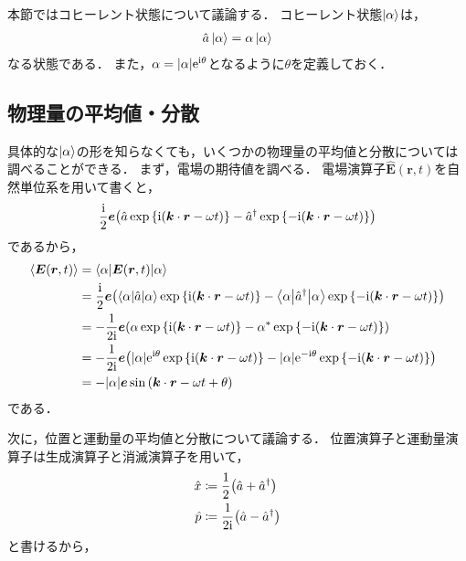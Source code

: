 \documentclass{report}
\begin{document}
  本節ではコヒーレント状態について議論する．
  コヒーレント状態$\ket{\alpha}$は，
  \begin{align}
    \hat{a}\ket{\alpha} = \alpha\ket{\alpha}
  \end{align}
  なる状態である．
  また，$\alpha = \abs{\alpha}\mathrm{e}^{\mathrm{i}\theta}$となるように$\theta$を定義しておく．
  \subsection{物理量の平均値・分散}
    具体的な$\ket{\alpha}$の形を知らなくても，いくつかの物理量の平均値と分散については調べることができる．
    まず，電場の期待値を調べる．
    電場演算子$\hat{\bm{E}}(\bm{r}, t)$を自然単位系を用いて書くと，
    \begin{align}
      \frac{\mathrm{i}}{2}\bm{e}\qty(\hat{a}\exp\qty{\mathrm{i}(\bm{k}\cdot\bm{r} - \omega t)} - \hat{a}^{\dag}\exp\qty{-\mathrm{i}(\bm{k}\cdot\bm{r} - \omega t)})
    \end{align}
    であるから，
    \begin{align}
      \ev{\bm{E}(\bm{r}, t)} &= \mel**{\alpha}{\bm{E}(\bm{r}, t)}{\alpha} \\ 
      &= \frac{\i}{2}\bm{e}\qty(\mel**{\alpha}{\hat{a}}{\alpha}\exp\qty{\i(\bm{k}\cdot\bm{r} - \omega t)} - \mel**{\alpha}{\hat{a}^{\dag}}{\alpha}\exp\qty{-\i(\bm{k}\cdot\bm{r} - \omega t)}) \\ 
      &= -\frac{1}{2\i}\bm{e}\qty(\alpha\exp\qty{\i(\bm{k}\cdot\bm{r} - \omega t)} - \alpha^*\exp\qty{-\i(\bm{k}\cdot\bm{r} - \omega t)}) \\ 
      &= -\frac{1}{2\i}\bm{e}\qty(\abs{\alpha}\e^{\i\theta}\exp\qty{\i(\bm{k}\cdot\bm{r} - \omega t)} - \abs{\alpha}\e^{-\i\theta}\exp\qty{-\i(\bm{k}\cdot\bm{r} - \omega t)}) \\ 
      &= -\abs{\alpha}\bm{e}\sin\qty(\bm{k}\cdot\bm{r} - \omega t + \theta)
    \end{align}
    である．
    \par
    次に，位置と運動量の平均値と分散について議論する．
    位置演算子と運動量演算子は生成演算子と消滅演算子を用いて，
    \begin{align}
      \hat{x} &\coloneqq \frac{1}{2}\qty(\hat{a} + \hat{a}^{\dag}) \\ 
      \hat{p} &\coloneqq \frac{1}{2\mathrm{i}}\qty(\hat{a} - \hat{a}^{\dag})
    \end{align}
    と書けるから，
\end{document}

